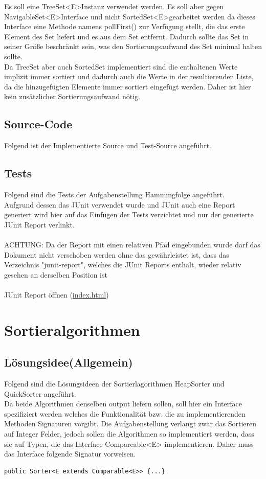 \documentclass[11pt, a4paper, twoside]{article}   	%
\newcommand{\srcDir}{../src/main/java}
\newcommand{\srcTestDir}{../src/test/java}
\newcommand{\mainPackage}{\srcDir/at/fhooe/swe4/lab3}
\newcommand{\mainTestPackage}{\srcTestDir/at/fhooe/swe4/lab3/test}
\newcommand{\junitReportDir}{junit-report}
\newcommand{\ideaSection}{Lösungsidee}
\newcommand{\sourceSection}{Source-Code}
\newcommand{\testSection}{Tests}
\begin{document}
Es soll eine TreeSet\textless E\textgreater Instanz verwendet werden. Es soll aber gegen NavigableSet\textless E\textgreater Interface und nicht SortedSet\textless E\textgreater gearbeitet werden da dieses Interface eine Methode namens pollFirst() zur Verfügung stellt, die das erste Element des Set liefert und es aus dem Set entfernt. Dadurch sollte das Set in seiner Größe beschränkt sein, was den Sortierungsaufwand des Set minimal halten sollte.\\
Da TreeSet aber auch SortedSet implementiert sind die enthaltenen Werte implizit immer sortiert und dadurch auch die Werte in der resultierenden Liste, da die hinzugefügten Elemente immer sortiert eingefügt werden. Daher ist hier kein zusätzlicher Sortierungsaufwand nötig.
\newpage
\subsection{\sourceSection}
Folgend ist der Implementierte Source und Test-Source angeführt.


\subsection{\testSection}
Folgend sind die Tests der Aufgabenstellung Hammingfolge angeführt.\\
Aufgrund dessen das JUnit verwendet wurde und JUnit auch eine Report generiert wird hier auf das Einfügen der Tests verzichtet und nur der generierte JUnit Report verlinkt.\\\\
{\color{myred} ACHTUNG: Da der Report mit einen relativen Pfad eingebunden wurde darf das Dokument nicht verschoben werden ohne das gewährleistet ist, dass das Verzeichnis "\junitReportDir", welches die JUnit Reports enthält, wieder relativ gesehen an derselben Position ist}\\\\
JUnit Report öffnen (\href{\junitReportDir/index.html}{index.html})

\newpage
{\color{myred}
	\section
		{Sortieralgorithmen}
}
\subsection{\ideaSection \hspace{2mm}(Allgemein)}
Folgend sind die Lösungsideen der Sortierlagorithmen HeapSorter und QuickSorter angeführt.\\
Da beide Algorithmen denselben output liefern sollen, soll hier ein Interface spezifiziert werden welches die Funktionalität bzw. die zu implementierenden Methoden Signaturen vorgibt. Die Aufgabenstellung verlangt zwar das Sortieren auf Integer Felder, jedoch sollen die Algorithmen so implementiert werden, dass sie auf Typen, die das Interface Compareable<E> implementieren. Daher muss das Interface folgende Signatur vorweisen.
\begin{lstlisting}
public Sorter<E extends Comparable<E>> {...}
\end{lstlisting}
\newpage
\end{document}
